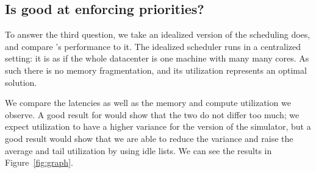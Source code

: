 \subsection{Is \sys{} good at enforcing priorities?}

To answer the third question, we take an idealized version of the scheduling
\sys{} does, and compare \sys{}'s performance to it. The idealized scheduler
runs in a centralized setting: it is as if the whole datacenter is one machine
with many many cores. As such there is no memory fragmentation, and its
utilization represents an optimal solution.

We compare the latencies as well as the memory and compute utilization we
observe. A good result for \sys{} would show that the two do not differ too
much; we expect utilization to have a higher variance
for the \sys{} version of the simulator, but a good result would show that we
are able to reduce the variance and raise the average and tail utilization by
using idle lists. We can see the results in Figure~\ref{fig:graph}.











